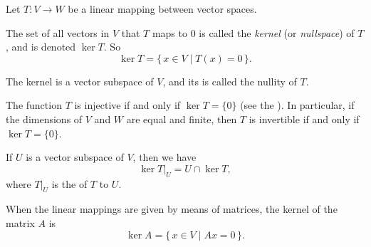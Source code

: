 \documentclass[12pt]{article}
\begin{document}

Let $T\colon V\to W$ be a linear mapping between vector spaces.

The set of all vectors in $V$ that $T$ maps to $0$
is called the \emph{kernel} (or \emph{nullspace}) of $T$,
and is denoted $\ker T$. So
\[
  \ker T = \{\, x \in V\mid T(x)=0\,\}.
\]

The kernel is a vector subspace of $V$,
and its  is called the nullity of $T$.

The function $T$ is injective if and only if $\ker T=\{0\}$
(see the ).
In particular, if the dimensions of $V$ and $W$ are equal and finite,
then $T$ is invertible if and only if $\ker T=\{0\}$.

If $U$ is a vector subspace of $V$, then we have
\[
  \ker T|_U = U \cap \ker T,
\]
where $T|_U$ is
the  of $T$ to $U$.

When the linear mappings are given by means of matrices,
the kernel of the matrix $A$ is
\[
  \ker A=\{\,x\in V \mid Ax=0\,\}.
\]
\end{document}
